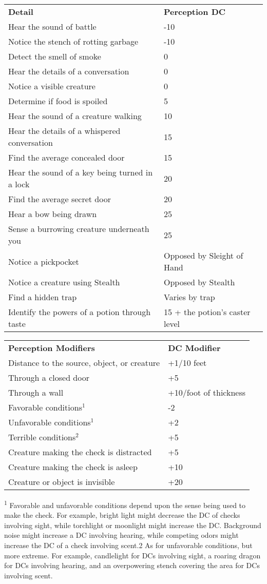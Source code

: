 \begin{table}
 \begin{tabular}{ll}
\textbf{Detail} & \textbf{Perception DC}\\
Hear the sound of battle & -10\\
Notice the stench of rotting garbage & -10\\
Detect the smell of smoke & 0\\
Hear the details of a conversation & 0\\
Notice a visible creature &0\\
Determine if food is spoiled & 5\\
Hear the sound of a creature walking & 10\\
Hear the details of a whispered conversation & 15\\
Find the average concealed door& 15\\
Hear the sound of a key being turned in a lock & 20\\
Find the average secret door & 20\\
Hear a bow being drawn & 25\\
Sense a burrowing creature underneath you & 25\\
Notice a pickpocket & Opposed by Sleight of Hand\\
Notice a creature using Stealth & Opposed by Stealth\\
Find a hidden trap &Varies by trap\\
Identify the powers of a potion through taste & 15 + the potion's caster level\\
 \end{tabular}

\end{table}
\begin{table}
 \begin{tabular}{ll}
\textbf{Perception Modifiers} & \textbf{DC Modifier}\\
Distance to the source, object, or creature & +1/10 feet\\
Through a closed door & +5\\
Through a wall & +10/foot of thickness\\
Favorable conditions\(^{1}\) & -2\\
Unfavorable conditions\(^{1}\) & +2\\
Terrible conditions\(^{2}\) & +5\\
Creature making the check is distracted & +5\\
Creature making the check is asleep & +10\\
Creature or object is invisible & +20\\
 \end{tabular}
\textsuperscript{1} Favorable and unfavorable conditions depend upon the sense being used to make the check. For example, bright light might decrease the DC of checks involving sight, while torchlight or moonlight might increase the DC. Background noise might increase a DC involving hearing, while competing odors might increase the DC of a check involving scent.2 As for unfavorable conditions, but more extreme. For example, candlelight for DCs involving sight, a roaring dragon for DCs involving hearing, and an overpowering stench covering the area for DCs involving scent.
\end{table}		
